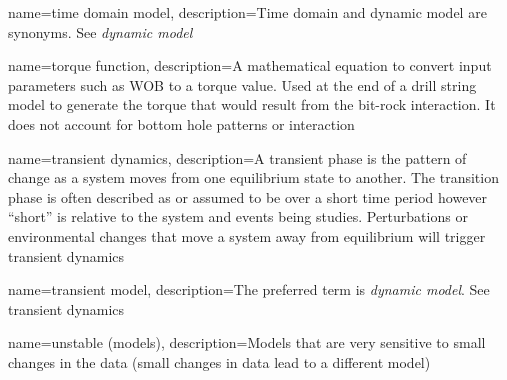 {
	name=time domain model,
	description=Time domain and dynamic model are synonyms.  See \emph{dynamic model}
}

{
	name=torque function,
	description=A mathematical equation to convert input parameters such as WOB to a torque value.  Used at the end of a drill string model to generate the torque that would result from the bit-rock interaction.  It does not account for bottom hole patterns or interaction
}

{
	name=transient dynamics,
	description=A transient phase is the pattern of change as a system moves from one equilibrium state to another.  The transition phase is often described as\comma{} or assumed to be\comma{} over a short time period\comma{} however\comma{} ``short'' is relative to the system and events being studies.  Perturbations or environmental changes that move a system away from equilibrium will trigger transient dynamics
}

{
	name=transient model,
	description=The preferred term is \textit{dynamic model}.  See transient dynamics
}


{
    name=unstable (models),
    description=Models that are very sensitive to small changes in the data (small changes in data lead to a different model)
}

